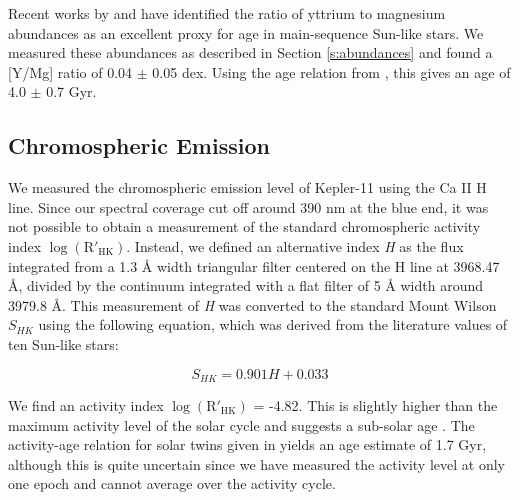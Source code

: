 \documentclass[twocolumn,trackchanges]{aastex61}
\begin{document}
Recent works by \citet{Nissen2015} and \citet{TucciMaia2016} have identified the ratio of yttrium to magnesium abundances as an excellent proxy for age in main-sequence Sun-like stars. We measured these abundances as described in Section \ref{s:abundances} and found a [Y/Mg] ratio of 0.04 $\pm$ 0.05 dex. Using the age relation from \citet{TucciMaia2016}, this gives an age of 4.0 $\pm$ 0.7 Gyr.

\subsection{Chromospheric Emission}

We measured the chromospheric emission level of Kepler-11 using the Ca II H line. Since our spectral coverage cut off around 390 nm at the blue end, it was not possible to obtain a measurement of the standard chromospheric activity index $\log(\mathrm{R'_{HK}})$. Instead, we defined an alternative index \textit{H} as the flux integrated from a 1.3 \r{A} width triangular filter centered on the H line at 3968.47 \r{A}, divided by the continuum integrated with a flat filter of 5 \r{A} width around 3979.8 \r{A}. This measurement of \textit{H} was converted to the standard Mount Wilson $S_{HK}$ using the following equation, which was derived from the literature values of ten Sun-like stars:

\begin{equation}
S_{HK} = 0.901 H + 0.033
\end{equation}

We find an activity index $\log(\mathrm{R'_{HK}})$ = -4.82. This is slightly higher than the maximum activity level of the solar cycle and suggests a sub-solar age \citep{Skumanich1972}. The activity-age relation for solar twins given in \citet{Freitas2016} yields an age estimate of 1.7 Gyr, although this is quite uncertain since we have measured the activity level at only one epoch and cannot average over the activity cycle.
\end{document}
